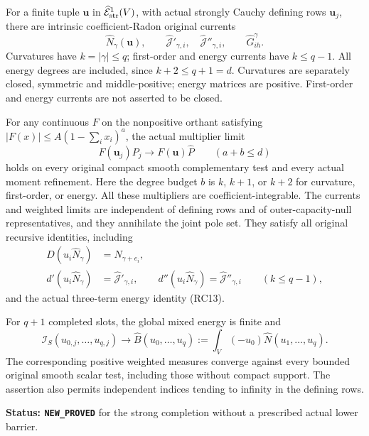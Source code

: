 \begin{theorem}
\label{thm:r11-strong-completed-calculus}
For a finite tuple $\mathbf u$ in
$\widehat{\mathcal E}^1_{\rm str}(V)$, with actual strongly
Cauchy defining rows $\mathbf u_j$, there are intrinsic
coefficient-Radon original currents
\[
 \widehat N_\gamma(\mathbf u),\qquad
 \widehat{\mathcal J}'_{\gamma,i},\quad
 \widehat{\mathcal J}''_{\gamma,i},\qquad
 \widehat G^\gamma_{ih}.
 \tag{IC10}
\]
Curvatures have $k=|\gamma|\leq q$; first-order and energy
currents have $k\leq q-1$. All energy degrees are included,
since $k+2\leq q+1=d$. Curvatures are separately closed,
symmetric and middle-positive; energy matrices are positive.
First-order and energy currents are not asserted to be closed.

For any continuous $F$ on the nonpositive orthant satisfying
$|F(x)|\leq A(1-\sum_i x_i)^a$, the actual multiplier limit
\[
                  F(\mathbf u_j)P_j
                         \longrightarrow F(\mathbf u)\widehat P
       \qquad(a+b\leq d)
 \tag{IC11}
\]
holds on every original compact smooth complementary test and
every actual moment refinement. Here the degree budget $b$ is
$k$, $k+1$, or $k+2$ for curvature, first-order, or energy.
All these multipliers are coefficient-integrable. The currents
and weighted limits are independent of defining rows and of
outer-capacity-null representatives, and they annihilate the
joint pole set. They satisfy all original recursive identities,
including
\[
 \begin{split}
 D(u_i\widehat N_\gamma)&=\widehat N_{\gamma+e_i},\\
 d'(u_i\widehat N_\gamma)&=\widehat{\mathcal J}'_{\gamma,i},\qquad
 d''(u_i\widehat N_\gamma)=\widehat{\mathcal J}''_{\gamma,i}
                         \qquad(k\leq q-1),
 \end{split}
 \tag{IC12}
\]
and the actual three-term energy identity (RC13).

For $q+1$ completed slots, the global mixed energy is finite and
\[
 \mathcal I_S(u_{0,j},\ldots,u_{q,j})
      \longrightarrow
 \widehat B(u_0,\ldots,u_q)
       :=\int_V(-u_0)\widehat N(u_1,\ldots,u_q).
 \tag{IC13}
\]
The corresponding positive weighted measures converge against
every bounded original smooth scalar test, including those
without compact support. The assertion also permits independent
indices tending to infinity in the defining rows.
\end{theorem}

\noindent\textbf{Status: \texttt{NEW\_PROVED}} for the strong
completion without a prescribed actual lower barrier.

